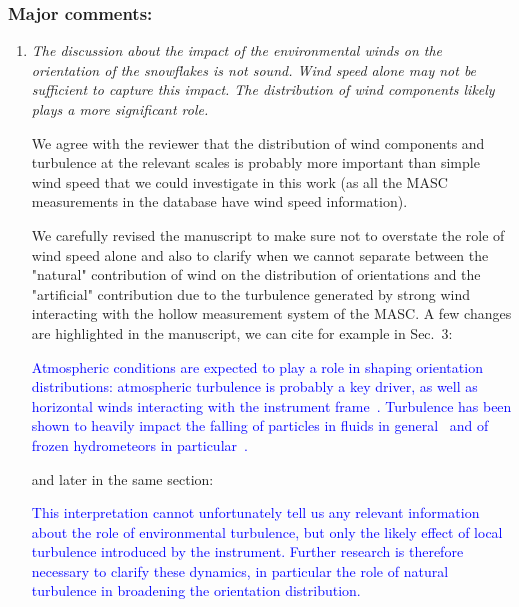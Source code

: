 \documentclass[12pt]{article}
\newcommand*{\blue}{\textcolor{blue}}
\begin{document}
\subsubsection*{Major comments:}
\begin{enumerate}
    \item \textit{The discussion about the impact of the environmental winds on the orientation of the snowflakes is not sound. Wind speed alone may not be sufficient to capture this impact. The distribution of wind components likely plays a more significant role.}

    We agree with the reviewer that the distribution of wind components and turbulence at the relevant scales is probably more important than simple wind speed that we could investigate in this work (as all the MASC measurements in the database have wind speed information).
    
    We carefully revised the manuscript to make sure not to overstate the role of wind speed alone and also to clarify when we cannot separate between the "natural" contribution of wind on the distribution of orientations and the "artificial" contribution due to the turbulence generated by strong wind interacting with the hollow measurement system of the MASC. A few changes are highlighted in the manuscript, we can cite for example in Sec.~3:

    \blue{Atmospheric conditions are expected to play a role in shaping orientation distributions: atmospheric turbulence is probably a key driver, as well as horizontal winds interacting with the instrument frame~\cite{Fitch_AMT_2021}. Turbulence has been shown to heavily impact the falling of particles in fluids in general~\cite{Petersen_JFM_2019,Brandt_ARFM_2022} and of frozen hydrometeors in particular~\cite{Nemes_JFM_2017,Li_JFM_2021}.}

    and later in the same section:

    \blue{This interpretation cannot unfortunately tell us any relevant information about the role of environmental turbulence, but only the likely effect of local turbulence introduced by the instrument.  Further research is therefore necessary to clarify these dynamics, in particular the role of natural turbulence in broadening the orientation distribution.}    
\end{enumerate}
\end{document}
